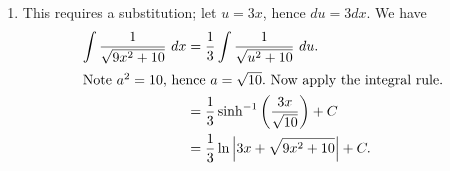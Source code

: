 \begin{example}
\begin{enumerate}[1)]
%

\item	 This requires a substitution; let $u = 3x$, hence $du = 3dx$. We have 
\begin{align*}
\int \frac{1}{\sqrt{9x^2+10}}\ dx &= \frac13\int\frac{1}{\sqrt{u^2+10}}\ du. \\
\intertext{Note $a^2=10$, hence $a = \sqrt{10}.$ Now apply the integral rule.}
 &= \frac13 \sinh^{-1}\left(\frac{3x}{\sqrt{10}}\right) + C \\
 &= \frac13 \ln \Big|3x+\sqrt{9x^2+10}\Big|+C.
\end{align*}
\end{enumerate}

\end{example}